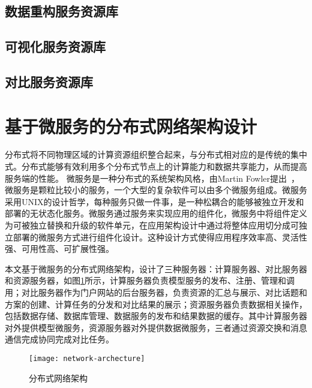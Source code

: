 \subsection{数据重构服务资源库}



\subsection{可视化服务资源库}



\subsection{对比服务资源库}


\section{基于微服务的分布式网络架构设计}
分布式将不同物理区域的计算资源组织整合起来，与分布式相对应的是传统的集中式。分布式能够有效利用多个分布式节点上的计算能力和数据共享能力，从而提高服务端的性能。
微服务是一种分布式的系统架构风格，由Martin Fowler提出~\cite{fowler2014microservices}，微服务是颗粒比较小的服务，一个大型的复杂软件可以由多个微服务组成。微服务采用UNIX的设计哲学，每种服务只做一件事，是一种松耦合的能够被独立开发和部署的无状态化服务。微服务通过服务来实现应用的组件化，微服务中将组件定义为可被独立替换和升级的软件单元，在应用架构设计中通过将整体应用切分成可独立部署的微服务方式进行组件化设计。这种设计方式使得应用程序效率高、灵活性强、可用性高、可扩展性强。

本文基于微服务的分布式网络架构，设计了三种服务器：计算服务器、对比服务器和资源服务器，如图\ref{fig:network-archecture}所示，计算服务器负责模型服务的发布、注册、管理和调用；对比服务器作为门户网站的后台服务器，负责资源的汇总与展示、对比话题和方案的创建、计算任务的分发和对比结果的展示；资源服务器负责数据相关操作，包括数据存储、数据库管理、数据服务的发布和结果数据的缓存。其中计算服务器对外提供模型微服务，资源服务器对外提供数据微服务，三者通过资源交换和消息通信完成协同完成对比任务。

\begin{figure}[!htbp]
    \centering
    \texttt{[image: network-archecture]}
    \caption{分布式网络架构}
    \label{fig:network-archecture}
\end{figure}

